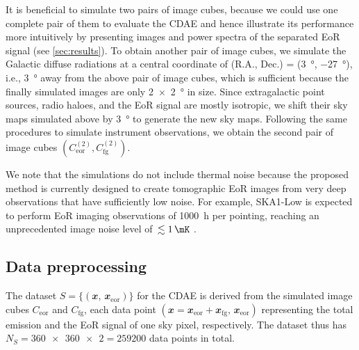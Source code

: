 \documentclass[fleqn,usenatbib]{mnras}
\newcommand{\R}[1]{\mathrm{#1}}
\newcommand{\B}[1]{\mathbfit{#1}}
\newcommand{\editwip}[1]{{\leavevmode\color{magenta}#1}}
\begin{document}
\editwip{%
It is beneficial to simulate two pairs of image cubes, because we could use
one complete pair of them to evaluate the CDAE and hence illustrate its
performance more intuitively by presenting images and power spectra of the
separated EoR signal (see \autoref{sec:results}).
To obtain another pair of image cubes, we simulate the Galactic diffuse
radiations at a central coordinate of (R.A., Dec\@.) = (\SI{3}{\degree},
\SI{-27}{\degree}), i.e., \SI{3}{\degree} away from the above pair of image
cubes, which is sufficient because the finally simulated images are only
\SI{2 x 2}{\degree} in size.
Since extragalactic point sources, radio haloes, and the EoR signal are
mostly isotropic, we shift their sky maps simulated above by
\SI{3}{\degree} to generate the new sky maps.
Following the same procedures to simulate instrument observations, we
obtain the second pair of image cubes
$\left( C_{\R{eor}}^{(2)}, C_{\R{fg}}^{(2)} \right)$.

We note that the simulations do not include thermal noise because the
proposed method is currently designed to create tomographic EoR images
from very deep observations that have sufficiently low noise.
For example, SKA1-Low is expected to perform EoR imaging observations of
\SI{1000}{\hour} per pointing, reaching an unprecedented image noise level
of $\,\lesssim \SI{1}{\mK}$ \citep[e.g.,][]{mellema2013rev,koopmans2015rev}.
} %


\subsection{Data preprocessing}
\label{sec:preprocessing}

The dataset $S = \{(\B{x}, \,\B{x}_{\R{eor}})\}$ for the CDAE is derived
from the simulated image cubes $C_{\R{eor}}$ and $C_{\R{fg}}$, each data
point $(\B{x} = \B{x}_{\R{eor}} + \B{x}_{\R{fg}}, \,\B{x}_{\R{eor}})$
representing the total emission and the EoR signal of one sky pixel,
respectively.
\editwip{%
The dataset thus has $N_S = \num{360x360 x 2} = \num{259200}$
data points in total.}
\end{document}
